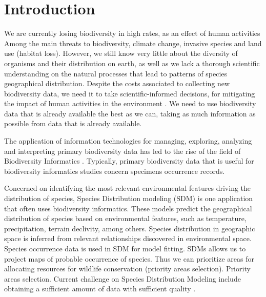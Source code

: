 \chapter{Introduction}\label{introduction}

We are currently losing biodiversity in high rates, as an effect of human activities
Among the main threats to biodiversity, climate change, invasive species and land use (habitat loss).
However, we still know very little about the diversity of organisms and their distribution on earth, as well as we lack a thorough scientific understanding on the natural processes that lead to patterns of species geographical distribution.
Despite the costs associated to collecting new biodiversity data, we need it to take scientific-informed decisions, for mitigating the impact of human activities in the environment \cite{Dozzier_4paradigm_2009, Funk1999}.
We need to use biodiversity data that is already available the best as we can, taking as much information as possible from data that is already available.

The application of information technologies for managing, exploring, analyzing and interpreting primary biodiversity data has led to the rise of the field of Biodiversity Informatics \cite{Soberon2004}.
Typically, primary biodiversity data that is useful for biodiversity informatics studies concern specimens occurrence records.

Concerned on identifying the most relevant environmental features driving the distribution of species, Species Distribution modeling (SDM) is one application that often uses biodiversity informatics.
These models predict the geographical distribution of species based on environmental features, such as temperature, precipitation, terrain declivity, among others.
Species distribution in geographic space is inferred from relevant relationships discovered in environmental space.
Species occurrence data is used in SDM for model fitting. 
SDMs allows us to project maps of probable occurrence of species.
Thus we can prioritize areas for allocating resources for wildlife conservation (priority areas selection).
Priority areas selection. %
Current challenge on Species Distribution Modeling include obtaining a sufficient amount of data with sufficient quality \cite{Araujo2006}.


